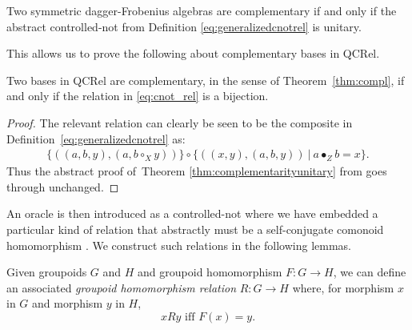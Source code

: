 \begin{theorem}
\label{thm:complementarityunitary}
  Two symmetric dagger-Frobenius algebras are complementary if and only if the abstract controlled-not from Definition \ref{eq:generalizedcnotrel} is unitary.
\end{theorem}

\noindent This allows us to prove the following about  complementary bases in QCRel.
\begin{theorem}
Two bases in QCRel are complementary, in the sense of Theorem~\ref{thm:compl}, if and only if the relation in \eqref{eq:cnot_rel} is a bijection.
\end{theorem}
\begin{proof}
The relevant relation can clearly be seen to be the composite in Definition~\ref{eq:generalizedcnotrel} as:
\begin{align}
\{((a,b,y),(a,b\circ_Xy))\} \circ \{((x,y),(a,b,y))~|~a\bullet_Zb=x\}.
\end{align}
Thus the abstract proof of\ Theorem \ref{thm:complementarityunitary} from \cite{zeng2014abstract} goes through unchanged.
\end{proof}

An oracle is then introduced as a controlled-not where we have embedded a particular kind of relation that abstractly must be a self-conjugate comonoid homomorphism \cite{zeng2014abstract}. We construct such relations in the following lemmas.

\begin{defn}
Given groupoids $G$ and $H$ and groupoid homomorphism $F:G\to H$, we can define an associated \emph{groupoid homomorphism relation} $R:G\to H$ where, for morphism $x$ in $G$ and morphism $y$ in $H$,
$$
xRy \mbox{ iff }F(x) = y.
$$
\end{defn}

